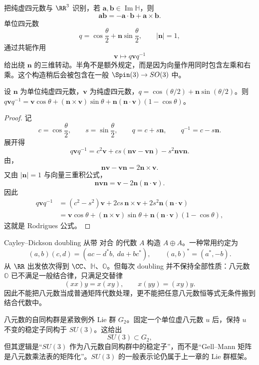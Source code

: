 把纯虚四元数与 $\RR^3$ 识别，若 $\mathbf a,\mathbf b\in\operatorname{Im}\mathbb H$，则
\begin{equation}
\mathbf a\mathbf b
=-\mathbf a\cdot\mathbf b
+\mathbf a\times\mathbf b.
\label{eq:quaternion-dot-cross}
\end{equation}
单位四元数
\[
q=\cos\frac\theta2+\mathbf n\sin\frac\theta2,
\qquad
|\mathbf n|=1,
\]
通过共轭作用
\[
\mathbf v\longmapsto q\mathbf vq^{-1}
\]
给出绕 $\mathbf n$ 的三维转动。半角不是额外规定，而是因为向量作用同时包含左乘和右乘。这个构造稍后会被包含在一般 $\Spin(3)\to SO(3)$ 中。

\begin{proposition}
设 $\mathbf n$ 为单位纯虚四元数，$\mathbf v$ 为纯虚四元数，$q=\cos(\theta/2)+\mathbf n\sin(\theta/2)$。则 $q\mathbf vq^{-1}=\mathbf v\cos\theta+(\mathbf n\times\mathbf v)\sin\theta+\mathbf n(\mathbf n\cdot\mathbf v)(1-\cos\theta)$。
\end{proposition}
\begin{proof}
记
\[
c=\cos\frac\theta2,
\qquad
s=\sin\frac\theta2,
\qquad
q=c+s\mathbf n,
\qquad
q^{-1}=c-s\mathbf n.
\]
展开得
\[
q\mathbf vq^{-1}
=c^2\mathbf v
+cs(\mathbf n\mathbf v-\mathbf v\mathbf n)
-s^2\mathbf n\mathbf v\mathbf n.
\]
由，
\[
\mathbf n\mathbf v-\mathbf v\mathbf n
=2\mathbf n\times\mathbf v.
\]
又由 $|\mathbf n|=1$ 与向量三重积公式，
\[
\mathbf n\mathbf v\mathbf n
=
\mathbf v-2\mathbf n(\mathbf n\cdot\mathbf v).
\]
因此
\[
\begin{aligned}
q\mathbf vq^{-1}
&=(c^2-s^2)\mathbf v
+2cs\,\mathbf n\times\mathbf v
+2s^2\mathbf n(\mathbf n\cdot\mathbf v)\\
&=
\mathbf v\cos\theta
+(\mathbf n\times\mathbf v)\sin\theta
+\mathbf n(\mathbf n\cdot\mathbf v)(1-\cos\theta),
\end{aligned}
\]
这就是 Rodrigues 公式。
\end{proof}


Cayley--Dickson doubling 从带 对合 的代数 $A$ 构造 $A\oplus A$。一种常用约定为
\[
(a,b)(c,d)
=
(ac-d^*b,\ da+bc^*),
\qquad
(a,b)^*=(a^*,-b).
\]
从 $\RR$ 出发依次得到 $\CC$、$\mathbb H$、$\mathbb O$。但每次 doubling 并不保持全部性质：八元数 $\mathbb O$ 已不满足一般结合律，只满足交替律
\[
(xx)y=x(xy),
\qquad
x(yy)=(xy)y.
\]
因此不能把八元数当成普通矩阵代数处理，更不能把任意八元数恒等式无条件搬到结合代数中。

八元数的自同构群是紧致例外 Lie 群 $G_2$。固定一个单位虚八元数 $u$ 后，保持 $u$ 不变的稳定子同构于 $SU(3)$。这给出
\[
SU(3)\subset G_2,
\]
但其逻辑是“$SU(3)$ 作为八元数自同构群中的稳定子”，而不是“Gell--Mann 矩阵是八元数乘法表的矩阵化”。$SU(3)$ 的一般表示论仍属于上一章的 Lie 群框架。

